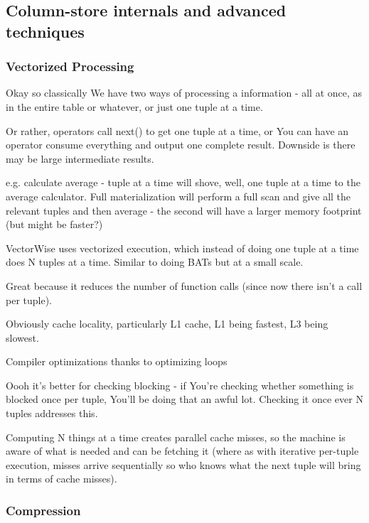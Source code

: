 \documentclass{article}
\begin{document}
	\subsection{Column-store internals and advanced techniques}
	
		\subsubsection{Vectorized Processing}
		
			Okay so classically We have two ways of processing a information - all at once, as in the entire table or whatever, or just one tuple at a time.
			
			Or rather, operators call next() to get one tuple at a time, or You can have an operator consume everything and output one complete result. Downside is there may be large intermediate results.
			
			e.g. calculate average - tuple at a time will shove, well, one tuple at a time to the average calculator. Full materialization will perform a full scan and give all the relevant tuples and then average - the second will have a larger memory footprint (but might be faster?)
			
			VectorWise uses vectorized execution, which instead of doing one tuple at a time does N tuples at a time. Similar to doing BATs but at a small scale.
			
			Great because it reduces  the number of function calls (since now there isn't a call per tuple).
			
			Obviously cache locality, particularly L1 cache, L1 being fastest, L3 being slowest.
			
			Compiler optimizations thanks to optimizing loops
			
			Oooh it's better for checking blocking - if You're checking whether something is blocked once per tuple, You'll be doing that an awful lot. Checking it once ever N tuples addresses this.
			
			Computing N things at a time creates parallel cache misses, so the machine is aware of what is needed and can be fetching it (where as with iterative per-tuple execution, misses arrive sequentially so who knows what the next tuple will bring in terms of cache misses).
			
		\subsubsection{Compression}
			
\end{document}
